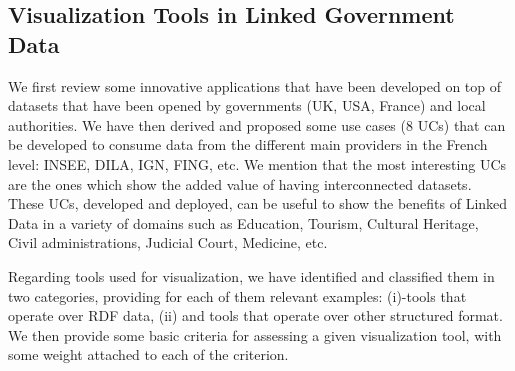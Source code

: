 \subsection{Visualization Tools in Linked Government Data} \label{visu}

We first review some innovative applications that have been developed on top of datasets that have been opened by governments (UK, USA, France) and local authorities. We have then derived and proposed some use cases (8 UCs) that can be developed to consume data from the different main providers in the French level: INSEE, DILA, IGN, FING, etc. We mention that the most interesting UCs are the ones which show the added value of having interconnected datasets. These UCs,  developed and deployed, can be useful to show the benefits of Linked Data in a variety of domains such as Education, Tourism, Cultural Heritage, Civil administrations, Judicial Court, Medicine, etc. 

Regarding tools used for visualization, we have identified and classified them in two categories, providing for each of them relevant examples: (i)-tools that operate over RDF data, (ii) and tools that operate over other structured format. We then provide some basic criteria for assessing a given visualization tool, with some weight attached to each of the criterion. 

